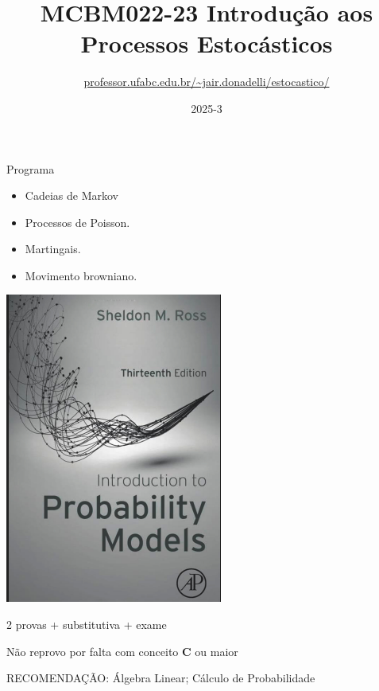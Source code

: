 \documentclass{beamer}
\title{MCBM022-23 Introdução aos Processos Estocásticos}
\subtitle{\url{professor.ufabc.edu.br/~jair.donadelli/estocastico/}}
\date{2025-3}
\begin{document}
\frame{\titlepage}

\begin{frame}{Programa}

  \begin{minipage}[h]{.45\linewidth}
    
    \begin{itemize}
    \item Cadeias de Markov 
    \item Processos de Poisson. 
    \item Martingais. 
    \item Movimento browniano.
    \end{itemize}
    
  \end{minipage}
  \begin{minipage}[h]{.45\linewidth}

    \includegraphics[scale=.3]{livro.png}
    
  \end{minipage}

  
  \vfill

  2 provas + substitutiva + exame 
  
  \vfill

  Não reprovo por falta com conceito \textbf{C} ou maior
  
  \vfill

 
  RECOMENDAÇÃO: Álgebra Linear; Cálculo de Probabilidade 
  
\end{frame}
\end{document}
